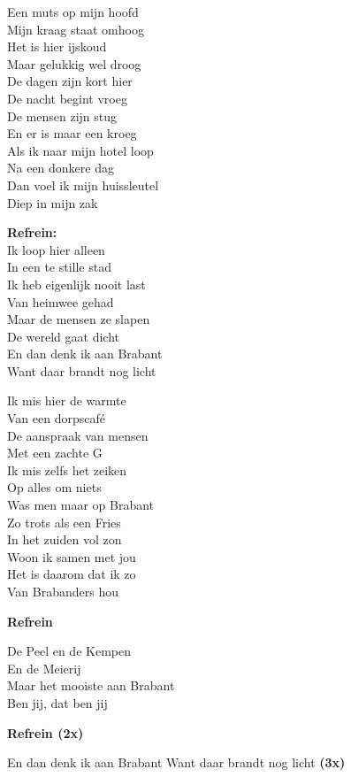 Een muts op mijn hoofd\\
Mijn kraag staat omhoog\\
Het is hier ijskoud\\
Maar gelukkig wel droog\\
De dagen zijn kort hier\\
De nacht begint vroeg\\
De mensen zijn stug\\
En er is maar een kroeg\\
Als ik naar mijn hotel loop\\
Na een donkere dag\\
Dan voel ik mijn huissleutel\\
Diep in mijn zak

\textbf{Refrein:}\\
Ik loop hier alleen\\
In een te stille stad\\
Ik heb eigenlijk nooit last\\
Van heimwee gehad\\
Maar de mensen ze slapen\\
De wereld gaat dicht\\
En dan denk ik aan Brabant\\
Want daar brandt nog licht

Ik mis hier de warmte\\
Van een dorpscafé\\
De aanspraak van mensen\\
Met een zachte G\\
Ik mis zelfs het zeiken\\
Op alles om niets\\
Was men maar op Brabant\\
Zo trots als een Fries\\
In het zuiden vol zon\\
Woon ik samen met jou\\
Het is daarom dat ik zo\\
Van Brabanders hou

\textbf{Refrein}

De Peel en de Kempen\\
En de Meierij\\
Maar het mooiste aan Brabant\\
Ben jij, dat ben jij

\textbf{Refrein (2x)}

En dan denk ik aan Brabant Want daar brandt nog licht \textbf{(3x)}
